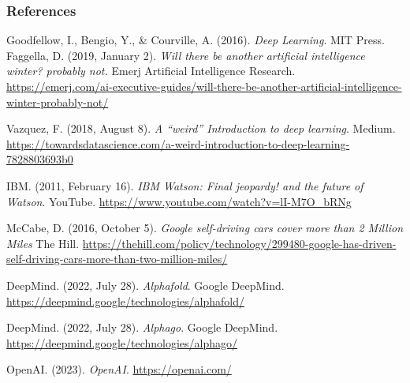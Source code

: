 \begin{vbframe}
\frametitle{References}
\footnotesize{
\begin{thebibliography}{99}
Goodfellow, I., Bengio, Y., \& Courville, A. (2016). \textit{Deep Learning}. MIT Press. 
Faggella, D. (2019, January 2). \textit{Will there be another artificial intelligence winter? probably not.} Emerj Artificial Intelligence Research. \url{https://emerj.com/ai-executive-guides/will-there-be-another-artificial-intelligence-winter-probably-not/} 

 Vazquez, F. (2018, August 8). \textit{A “weird” Introduction to deep learning}. Medium. \url{https://towardsdatascience.com/a-weird-introduction-to-deep-learning-7828803693b0}

 IBM. (2011, February 16). \textit{IBM Watson: Final jeopardy! and the future of Watson}. YouTube. \url{https://www.youtube.com/watch?v=lI-M7O_bRNg}

 McCabe, D. (2016, October 5). \textit{Google self-driving cars cover more than 2 Million Miles} The Hill. \url{https://thehill.com/policy/technology/299480-google-has-driven-self-driving-cars-more-than-two-million-miles/}

 DeepMind. (2022, July 28). \textit{Alphafold}. Google DeepMind. \url{https://deepmind.google/technologies/alphafold/} 

 DeepMind. (2022, July 28). \textit{Alphago}. Google DeepMind. \url{https://deepmind.google/technologies/alphago/} 

 OpenAI. (2023). \textit{OpenAI}. \url{https://openai.com/}

\end{thebibliography}
}
\end{vbframe}

\endlecture
